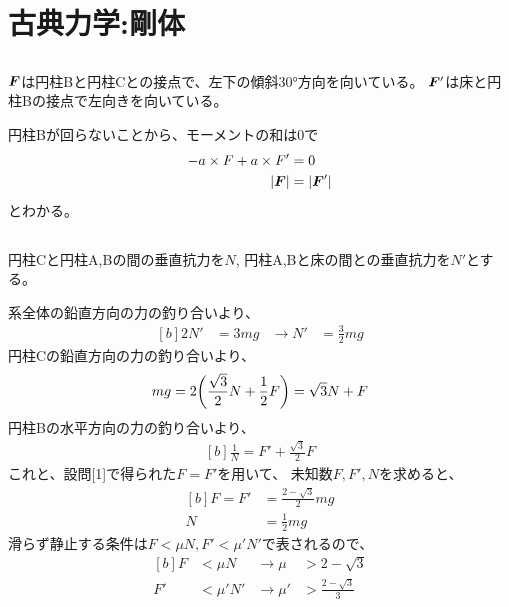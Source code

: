 \documentclass[../ap_2013.tex]{subfiles}
\begin{document}
\setcounter{chapter}{0}
\chapter{古典力学:剛体}
\section{}
\(\vb*{F}\)は円柱Bと円柱Cとの接点で、左下の傾斜\(\ang{30}\)方向を向いている。
\(\vb*{F}'\)は床と円柱Bの接点で左向きを向いている。

円柱Bが回らないことから、モーメントの和は0で
\begin{equation}\begin{aligned}[b]
    -a\times F+a\times F' &=0\\
    \abs{\vb*{F}} &= \abs{\vb*{F}'}
\end{aligned}\end{equation}
とわかる。

\section{}
円柱Cと円柱A,Bの間の垂直抗力を\(N\),
円柱A,Bと床の間との垂直抗力を\(N'\)とする。

系全体の鉛直方向の力の釣り合いより、
\begin{equation}\begin{aligned}[b]
    2N' &= 3mg &  \rightarrow N' &= \frac{3}{2}mg
\end{aligned}\end{equation}
円柱Cの鉛直方向の力の釣り合いより、
\begin{equation}\begin{aligned}[b]
    mg = 2\qty(\frac{\sqrt{3}}{2}N+\frac{1}{2}F)=\sqrt{3}N+F
\end{aligned}\end{equation}
円柱Bの水平方向の力の釣り合いより、
\begin{equation}\begin{aligned}[b]
    \frac{1}{N} = F' +\frac{\sqrt{3}}{2}F
\end{aligned}\end{equation}
これと、設問[1]で得られた\(F=F'\)を用いて、
未知数\(F,F',N\)を求めると、
\begin{equation}\begin{aligned}[b]
    F = F' &= \frac{2-\sqrt{3}}{2}mg\\
    N &= \frac{1}{2}mg
\end{aligned}\end{equation}
滑らず静止する条件は\(F<\mu N, F'<\mu' N'\)で表されるので、
\begin{equation}\begin{aligned}[b]
    F &< \mu N & \rightarrow \mu &> 2-\sqrt{3}\\
    F' &< \mu' N' &\rightarrow \mu' &> \frac{2-\sqrt{3}}{3}
\end{aligned}\end{equation}
\end{document}

